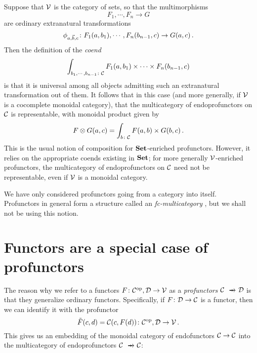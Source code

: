 Suppose that ${\mathcal{V}}$ is the category of sets, so that the multimorphisms
\[
  F_1,\cdots,F_n \to G
  \]
are ordinary extranatural transformations
\[
  \phi_{a,\vec{b},c} \colon F_1(a,b_1),\cdots,F_n(b_{n-1},c) \to G(a,c)\,.
  \]
Then the definition of the \emph{coend}
\[
  \int_{b_1,\cdots,b_{n-1}\colon{\mathcal{C}}} F_1(a,b_1)\times\cdots\times F_n(b_{n-1},c)
  \]
is that it is universal among all objects admitting such an extranatural transformation out of them.  
It follows that in this case (and more generally, if ${\mathcal{V}}$ is a cocomplete monoidal category), that the multicategory of endoprofunctors on ${\mathcal{C}}$ is representable, with monoidal product given by
\[
  F\otimes G(a, c) = \int_{b\colon {\mathcal{C}}} F(a,b) \times G(b,c)\,.
  \]
This is the usual notion of composition for ${\normalfont\textbf{Set}}$-enriched profunctors.  
However, it relies on the appropriate coends existing in ${\normalfont\textbf{Set}}$; for more generally ${\mathcal{V}}$-enriched profunctors, the multicategory of endoprofunctors on ${\mathcal{C}}$ need not be representable, even if ${\mathcal{V}}$ is a monoidal category.

We have only considered profunctors going from a category into itself.  
Profunctors in general form a structure called an \emph{fc-multicategory} \cite{Multicategories}, but we shall not be using this notion.

\section{Functors are a special case of profunctors}

The reason why we refer to a functors $F\colon {\mathcal{C}}^{\mathrm{op}},{\mathcal{D}} \to {\mathcal{V}}$ as a \emph{profunctors} $\C \pto \D$ is that they generalize ordinary functors.
Specifically, if $F \colon {\mathcal{D}} \to {\mathcal{C}}$ is a functor, then we can identify it with the profunctor
\[
  \tilde{F}(c,d) = {\mathcal{C}}(c, F(d)) \colon {\mathcal{C}}^{\mathrm{op}}, {\mathcal{D}} \to {\mathcal{V}}\,.
  \]
This gives us an embedding of the monoidal category of endofunctors ${\mathcal{C}} \to {\mathcal{C}}$ into the multicategory of endoprofunctors $\C \pto \C$:

